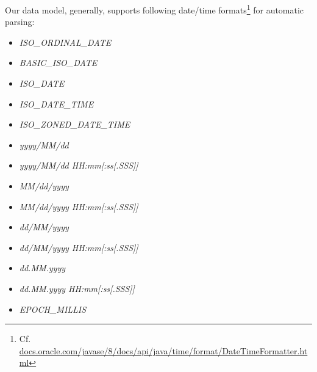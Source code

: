 Our data model, generally, supports following date/time formats\footnote{Cf. \textcolor{blue}{\href{https://docs.oracle.com/javase/8/docs/api/java/time/format/DateTimeFormatter.html}{docs.oracle.com/javase/8/docs/api/java/time/format/DateTimeFormatter.html}}} for automatic parsing:

\begin{itemize}
  \item \emph{ISO\_ORDINAL\_DATE}
  \item \emph{BASIC\_ISO\_DATE}
  \item \emph{ISO\_DATE}
  \item \emph{ISO\_DATE\_TIME}
  \item \emph{ISO\_ZONED\_DATE\_TIME}
  \item \emph{yyyy/MM/dd}
  \item \emph{yyyy/MM/dd HH:mm[:ss[.SSS]]}
  \item \emph{MM/dd/yyyy}
  \item \emph{MM/dd/yyyy HH:mm[:ss[.SSS]]}
  \item \emph{dd/MM/yyyy}
  \item \emph{dd/MM/yyyy HH:mm[:ss[.SSS]]}
  \item \emph{dd.MM.yyyy}
  \item \emph{dd.MM.yyyy HH:mm[:ss[.SSS]]}
  \item \emph{EPOCH\_MILLIS}
\end{itemize}

